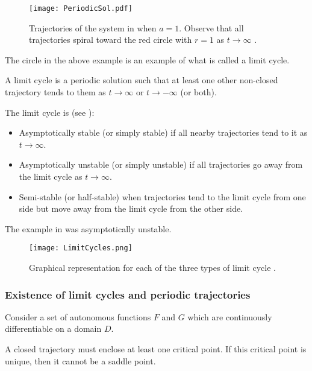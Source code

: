 \begin{figure}[!ht]
	\centering
	\texttt{[image: PeriodicSol.pdf]}
	\caption{Trajectories of the system in  when $a=1$. Observe that all trajectories spiral toward the red circle with $r=1$ as $t \to \infty$ \cite[Figure 9.7.1]{boyce}.}
	\label{fig:periodicsol}
\end{figure}

The circle in the above example is an example of what is called a limit cycle.

\begin{definition}
	A limit cycle is a periodic solution such that at least one other non-closed trajectory tends to them as $t \to \infty$ or $t \to -\infty$ (or both).
\end{definition}

The limit cycle is (see ): 
\begin{itemize}
	\item Asymptotically stable (or simply stable) if all nearby trajectories tend to it as $t \to \infty$.
	\item Asymptotically unstable (or simply unstable) if all trajectories go away from the limit cycle as $t \to \infty$.
	\item Semi-stable (or half-stable) when trajectories tend to the limit cycle from one side but move away from the limit cycle from the other side.
\end{itemize}

The example in  was asymptotically unstable.

\begin{figure}[!ht]
	\centering
	\texttt{[image: LimitCycles.png]}
	\caption{Graphical representation for each of the three types of limit cycle \cite{limitcycles}.}
	\label{fig:limitcycles}
\end{figure}

\subsubsection*{Existence of limit cycles and periodic trajectories}

Consider a set of autonomous functions $F$ and $G$ which are continuously differentiable on a domain $D$.

\begin{theorem}\label{thrm:periodictraj1}
	A closed trajectory must enclose at least one critical point. If this critical point is unique, then it cannot be a saddle point.
\end{theorem}

